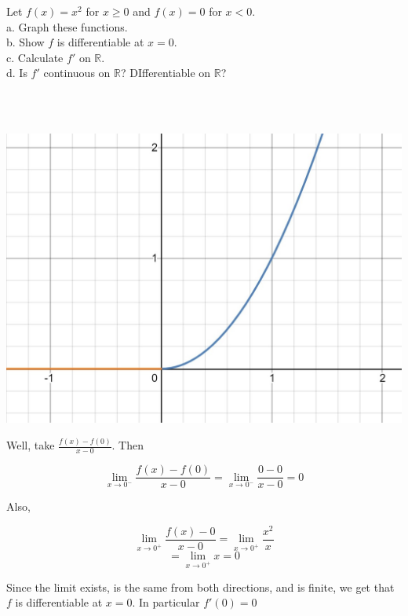 Let $f(x)=x^2$ for $x\geq0$ and $f(x)=0$ for $x<0$.\\

a. Graph these functions.\\

b. Show $f$ is differentiable at $x=0$.\\

c. Calculate $f'$ on $\mathbb{R}$.\\

d. Is $f'$ continuous on $\mathbb{R}$? DIfferentiable on $\mathbb{R}$?\\\\

\begin{solution}\renewcommand{\qedsymbol}{}\ \\
    \begin{center}
        \includegraphics[scale=1]{graph.JPG}\\
    \end{center}

    Well, take $\frac{f(x)-f(0)}{x-0}$. Then
    
    $$\lim_{x\rightarrow0^-}\frac{f(x)-f(0)}{x-0}=\lim_{x\rightarrow0^-}\frac{0-0}{x-0}=0$$
    
    Also,
    
    $$\lim_{x\rightarrow0^+}\frac{f(x)-0}{x-0}=\lim_{x\rightarrow0^+}\frac{x^2}{x}$$
    $$=\lim_{x\rightarrow0^+}x=0$$
    
    Since the limit exists, is the same from both directions, and is finite, we get that $f$ is
    differentiable at $x=0$. In particular $f'(0)=0$\\


\end{solution}
